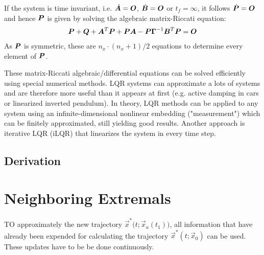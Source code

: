 		If the system is time invariant, i.e. \( \dot{\bm{A}} = \bm{O} \), \( \dot{\bm{B}} = \bm{O} \) or \( t_f = \infty \), it follows \( \dot{\bm{P}} = \bm{O} \) and hence \(\bm{P}\) is given by solving the algebraic matrix-Riccati equation:
		\begin{align*}
			\bm{P} + \bm{Q} + \bm{A}^T \bm{P} + \bm{P} \bm{A} - \bm{P} \bm{\Gamma}^{-1} \bm{B}^T \bm{P} = \bm{O}
		\end{align*}
		As \(\bm{P}\) is symmetric, these are \( n_x \cdot (n_x + 1) / 2 \) equations to determine every element of \(\bm{P}\).

		These matrix-Riccati algebraic/differential equations can be solved efficiently using special numerical methods. LQR systems can approximate a lots of systems and are therefore more useful than it appears at first (e.g. active damping in cars or linearized inverted pendulum). In theory, LQR methods can be applied to any system using an infinite-dimensional nonlinear embedding ("measurement") which can be finitely approximated, still yielding good results. Another approach is iterative LQR (iLQR) that linearizes the system in every time step.

		\subsection{Derivation} %

	\section{Neighboring Extremals}
		TO approximately the new trajectory \( \vec{x}^\ast\big(t; \vec{x}_a(t_1)\big) \), all information that have already been expended for calculating the trajectory \( \vec{x}^\ast(t; \vec{x}_0) \) can be used. These updates have to be be done continuously.

